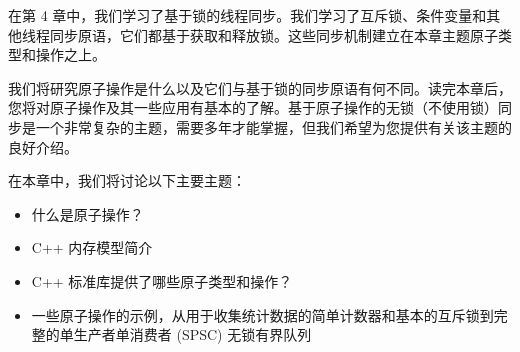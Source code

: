 在第 4 章中，我们学习了基于锁的线程同步。我们学习了互斥锁、条件变量和其他线程同步原语，它们都基于获取和释放锁。这些同步机制建立在本章主题原子类型和操作之上。

我们将研究原子操作是什么以及它们与基于锁的同步原语有何不同。读完本章后，您将对原子操作及其一些应用有基本的了解。基于原子操作的无锁（不使用锁）同步是一个非常复杂的主题，需要多年才能掌握，但我们希望为您提供有关该主题的良好介绍。

在本章中，我们将讨论以下主要主题：

\begin{itemize}
\item
什么是原子操作？
\item
C++ 内存模型简介

\item
C++ 标准库提供了哪些原子类型和操作？

\item
一些原子操作的示例，从用于收集统计数据的简单计数器和基本的互斥锁到完整的单生产者单消费者 (SPSC) 无锁有界队列
\end{itemize}




